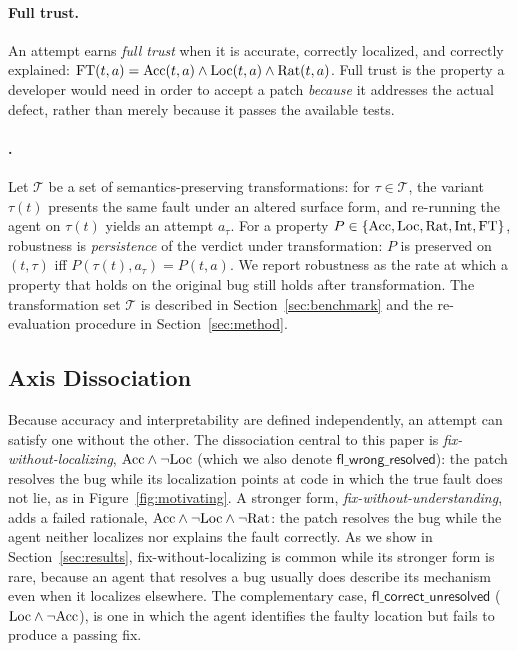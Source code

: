 \paragraph{Full trust.}
An attempt earns \emph{full trust} when it is accurate, correctly localized, and correctly
explained: $\mathrm{FT}(t, a) = \mathrm{Acc}(t, a) \wedge \mathrm{Loc}(t, a) \wedge \mathrm{Rat}(t, a)$. Full trust is the
property a developer would need in order to accept a patch \emph{because} it addresses the
actual defect, rather than merely because it passes the available tests.

\paragraph{\robustness{}.}
Let $\mathcal{T}$ be a set of semantics-preserving transformations: for $\tau \in
\mathcal{T}$, the variant $\tau(t)$ presents the same fault under an altered surface form,
and re-running the agent on $\tau(t)$ yields an attempt $a_\tau$. For a property $P \in
\{\mathrm{Acc}, \mathrm{Loc}, \mathrm{Rat}, \mathrm{Int}, \mathrm{FT}\}$, robustness is \emph{persistence} of the verdict under
transformation: $P$ is preserved on $(t, \tau)$ iff $P(\tau(t), a_\tau) = P(t, a)$. We
report robustness as the rate at which a property that holds on the original bug still
holds after transformation. The transformation set $\mathcal{T}$ is described in
Section~\ref{sec:benchmark} and the re-evaluation procedure in Section~\ref{sec:method}.

\subsection{Axis Dissociation}
\label{subsec:dissociation}

Because accuracy and interpretability are defined independently, an attempt can satisfy one
without the other. The dissociation central to this paper is \emph{fix-without-localizing},
$\mathrm{Acc} \wedge \lnot \mathrm{Loc}$ (which we also denote $\mathsf{fl\_wrong\_resolved}$): the patch
resolves the bug while its localization points at code in which the true fault does not lie,
as in Figure~\ref{fig:motivating}. A stronger form, \emph{fix-without-understanding}, adds a
failed rationale, $\mathrm{Acc} \wedge \lnot \mathrm{Loc} \wedge \lnot \mathrm{Rat}$: the patch resolves the bug
while the agent neither localizes nor explains the fault correctly. As we show in
Section~\ref{sec:results}, fix-without-localizing is common while its stronger form is rare,
because an agent that resolves a bug usually does describe its mechanism even when it
localizes elsewhere. The complementary case, $\mathsf{fl\_correct\_unresolved}$
($\mathrm{Loc} \wedge \lnot \mathrm{Acc}$), is one in which the agent identifies the faulty location but
fails to produce a passing fix.

